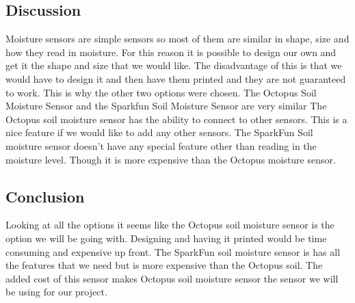 	\subsection{Discussion}
	Moisture sensors are simple sensors so most of them are similar in shape,
	size and how they read in moisture. For this reason it is possible to design
	our own and get it the shape and size that we would like. The disadvantage of this
	is that we would have to design it and then have them printed and they are
	not guaranteed to work. This is why the other two options were chosen. The
	Octopus Soil Moisture Sensor and the Sparkfun Soil Moisture Sensor are very similar
	The Octopus soil moisture sensor has the ability to connect to other sensors.
	This is a nice feature if we would like to add any other sensors. The SparkFun
	Soil moisture sensor doesn't have any special feature other than reading in
	the moisture level. Though it is more expensive than the Octopus moisture sensor.
	\subsection{Conclusion}
	Looking at all the options it seems like the Octopus soil moisture sensor is
	the option we will be going with. Designing and having it printed would be
	time consuming and expensive up front. The SparkFun soil moisture sensor is
	has all the features that we need but is more expensive than the Octopus soil.
	The added cost of this sensor makes Octopus soil moisture sensor the sensor
	we will be using for our project.

